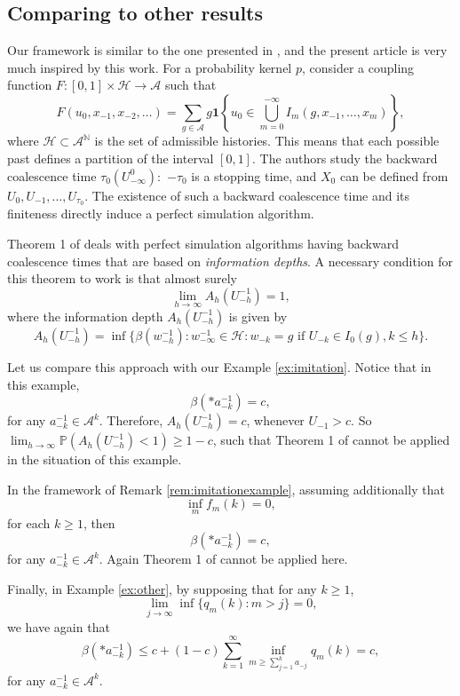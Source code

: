 \documentclass[a4paper]{article}
\def\P{{\mathbb P}}
\newcommand{\N}{\mathbb{N}}
\renewcommand{\H}{\mathcal{H}}
\newcommand{\A}{\mathcal{A}}
\begin{document}
 \subsection{Comparing to other results}
Our framework is similar to the one presented in \cite{desantispiccioni}, and the present article is very much inspired by this work.  For a probability kernel $p$, \cite{desantispiccioni} consider a coupling function $F:[0,1]\times \mathcal{H} \to \A$ such that
$$
F(u_0,x_{-1},x_{-2}, \ldots)=\sum_{g\in \A}g \mathbf{1}\left\{u_0 \in \bigcup_{m=0}^{-\infty}I_{m}(g,x_{-1},\ldots, x_{m})\right\},
$$
where $\mathcal{H} \subset \A^{\N}$ is the set of admissible histories. This means that each possible past defines a partition of the interval $[0,1]$. The authors study the backward coalescence time $\tau_0(U_{-\infty}^{0}):$  $-\tau_0$ is a stopping time, and $X_0$ can be defined from $U_0,U_{-1}, \ldots, U_{\tau_0}.$ The existence of such a backward coalescence time and its finiteness directly induce a perfect simulation algorithm. 

Theorem 1 of \cite{desantispiccioni} deals with perfect simulation algorithms having backward coalescence times that are based on {\it information depths}. A necessary condition for this theorem to work is that almost surely
$$
\lim_{h\to \infty}A_h(U_{-h}^{-1}) =1, 
$$
where the information depth $A_h(U_{-h}^{-1})$ is given by
$$
A_h(U_{-h}^{-1})=\inf\{\beta(w_{-h}^{-1}):w_{-\infty}^{-1}\in \H:w_{-k}=g \text{ if } U_{-k}\in I_0(g), k\leq h\}.
$$

Let us compare this approach with our Example \ref{ex:imitation}. Notice that in this example, 
$$
\beta(*a_{-k}^{-1})=c,
$$
for any $a_{-k}^{-1} \in \A^k$. Therefore, $A_h(U_{-h}^{-1})=c$, whenever $U_{-1}>c$. So $\lim_{h\to \infty}\P(A_h(U_{-h}^{-1})<1) \geq 1-c$, such that Theorem 1 of \cite{desantispiccioni} cannot be applied in the situation of this example.

In the framework of Remark \ref{rem:imitationexample}, assuming additionally that
$$
\inf_m f_m(k)=0,
$$
for each $k\geq 1$, then 
$$
\beta(*a_{-k}^{-1})=c,
$$
for any $a_{-k}^{-1} \in \A^k$.  Again Theorem 1 of \cite{desantispiccioni} cannot be applied here.

Finally, in Example \ref{ex:other},
by supposing that for any $k\geq 1$, 
$$
\lim_{j\to \infty}\inf\{q_m(k):m > j\}= 0,
$$
we have again that 
$$
\beta(*a_{-k}^{-1})\leq c+(1-c)\sum_{k=1}^{\infty}\inf_{m \geq \sum_{j=1}^{k} a_{-j}}q_m(k)=c,
$$
for any $a_{-k}^{-1} \in \A^k$. 
\end{document}
